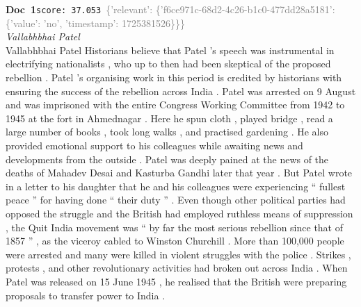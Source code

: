 \documentclass[a4paper,11pt]{article}
\begin{document}
\begin{docenv}
{\footnotesize\textcolor{doccolor}{\textbf{Doc~1}}}\hfill{\tiny\texttt{score:~37.053}}\ {\tiny\textcolor{gray}{\{'relevant': \{'f6ce971c-68d2-4c26-b1c0-477dd28a5181': \{'value': 'no', 'timestamp': 1725381526\}\}\}}}\\[3pt]
{\small\textit{Vallabhbhai Patel}}\\[2pt]
\vspace{2pt}
{\footnotesize Vallabhbhai Patel
Historians believe that Patel 's speech was instrumental in electrifying nationalists , who up to then had been skeptical of the proposed rebellion . Patel 's organising work in this period is credited by historians with ensuring the success of the rebellion across India . Patel was arrested on 9 August and was imprisoned with the entire Congress Working Committee from 1942 to 1945 at the fort in Ahmednagar . Here he spun cloth , played bridge , read a large number of books , took long walks , and practised gardening . He also provided emotional support to his colleagues while awaiting news and developments from the outside . Patel was deeply pained at the news of the deaths of Mahadev Desai and Kasturba Gandhi later that year . But Patel wrote in a letter to his daughter that he and his colleagues were experiencing `` fullest peace '' for having done `` their duty '' . Even though other political parties had opposed the struggle and the British had employed ruthless means of suppression , the Quit India movement was `` by far the most serious rebellion since that of 1857 '' , as the viceroy cabled to Winston Churchill . More than 100,000 people were arrested and many were killed in violent struggles with the police . Strikes , protests , and other revolutionary activities had broken out across India . When Patel was released on 15 June 1945 , he realised that the British were preparing proposals to transfer power to India .}
\end{docenv}
\end{document}
